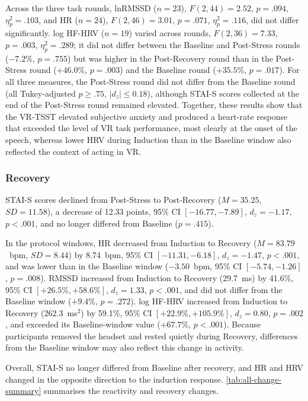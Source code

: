 Across the three task rounds, lnRMSSD ($n=23$), $F(2,44)=2.52$, $p=.094$, $\eta_p^2=.103$, and HR ($n=24$), $F(2,46)=3.01$, $p=.071$, $\eta_p^2=.116$, did not differ significantly. log HF-HRV ($n=19$) varied across rounds, $F(2,36)=7.33$, $p=.003$, $\eta_p^2=.289$; it did not differ between the Baseline and Post-Stress rounds ($-7.2\%$, $p=.755$) but was higher in the Post-Recovery round than in the Post-Stress round ($+46.0\%$, $p=.003$) and the Baseline round ($+35.5\%$, $p=.017$). For all three measures, the Post-Stress round did not differ from the Baseline round (all Tukey-adjusted $p \geq .75$, $|d_z| \leq 0.18$), although STAI-S scores collected at the end of the Post-Stress round remained elevated. Together, these results show that the VR-TSST elevated subjective anxiety and produced a heart-rate response that exceeded the level of VR task performance, most clearly at the onset of the speech, whereas lower HRV during Induction than in the Baseline window also reflected the context of acting in VR.

\subsubsection{Recovery}
STAI-S scores declined from Post-Stress to Post-Recovery ($M=35.25$, $SD=11.58$), a decrease of 12.33 points, 95\% CI $[-16.77, -7.89]$, $d_z=-1.17$, $p<.001$, and no longer differed from Baseline ($p=.415$).

In the protocol windows, HR decreased from Induction to Recovery ($M=83.79$~bpm, $SD=8.44$) by 8.74~bpm, 95\% CI $[-11.31, -6.18]$, $d_z=-1.47$, $p<.001$, and was lower than in the Baseline window ($-3.50$~bpm, 95\% CI $[-5.74, -1.26]$, $p=.008$). RMSSD increased from Induction to Recovery (29.7~ms) by 41.6\%, 95\% CI $[+26.5\%, +58.6\%]$, $d_z=1.33$, $p<.001$, and did not differ from the Baseline window ($+9.4\%$, $p=.272$). log HF-HRV increased from Induction to Recovery (262.3~ms$^2$) by 59.1\%, 95\% CI $[+22.9\%, +105.9\%]$, $d_z=0.80$, $p=.002$, and exceeded its Baseline-window value ($+67.7\%$, $p<.001$). Because participants removed the headset and rested quietly during Recovery, differences from the Baseline window may also reflect this change in activity.

Overall, STAI-S no longer differed from Baseline after recovery, and HR and HRV changed in the opposite direction to the induction response. \autoref{tab:all-change-summary} summarises the reactivity and recovery changes.


